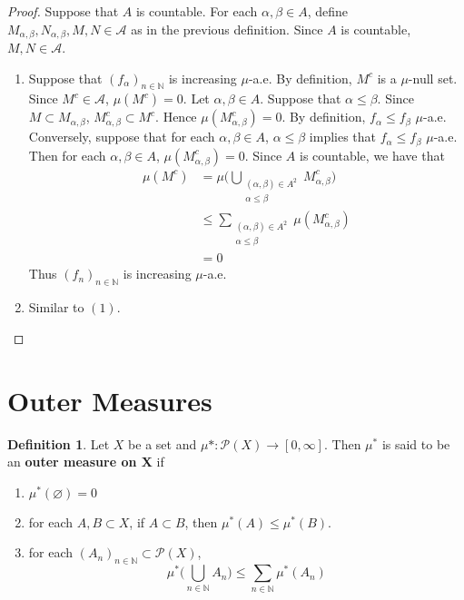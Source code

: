 \documentclass{book}
\theoremstyle{definition}
\newtheorem{defn}[definition]{Definition}
\newcommand{\al}{\alpha}
\newcommand{\be}{\beta}
\newcommand{\N}{\mathbb{N}}
\newcommand{\MA}{\mathcal{A}}
\newcommand{\MP}{\mathcal{P}}
\newcommand{\ld}[1]{\label{defn:#1}}
\DeclareMathOperator*{\0}{\mbf{0}}
\DeclareMathOperator*{\1}{\mbf{1}}
\begin{document}
	\begin{proof} Suppose that $A$ is countable. For each $\al, \be \in A$, define $M_{\al, \be},N_{\al, \be},M,N \in \MA$ as in the previous definition. Since $A$ is countable, $M,N \in \MA$. 
		\begin{enumerate}
			\item Suppose that $(f_{\al})_{n \in \N}$ is increasing $\mu$-a.e. By definition, $M^c$ is a $\mu$-null set. Since $M^c \in \MA$, $\mu(M^c) = 0$. Let $\al, \be \in A$. Suppose that $\al \leq \be$. Since $M \subset M_{\al, \be}$, $M_{\al, \be}^c \subset M^c$. Hence $\mu(M_{\al, \be}^c) = 0$. By definition, $f_{\al} \leq f_{\be}$ $\mu$-a.e.\\
			Conversely, suppose that for each $\al, \be \in A$, $\al \leq \be$ implies that $f_{\al} \leq f_{\be}$ $\mu$-a.e. Then for each $\al, \be \in A$, $\mu(M_{\al, \be}^c) = 0$. Since $A$ is countable, we have that
			\begin{align*}
				\mu(M^c) 
				& = \mu \bigg( \bigcup\limits_{\substack{(\al, \be) \in A^2 \\ \al \leq \be}} M_{\al, \be}^c \bigg) \\
				& \leq \sum_{\substack{(\al, \be) \in A^2 \\ \al \leq \be}} \mu(M_{\al, \be}^c) \\
				& = 0
			\end{align*}
			Thus $(f_n)_{n \in \N}$ is increasing $\mu$-a.e.
			\item Similar to $(1)$.
		\end{enumerate}
	\end{proof}







	
	
	
	
	
	
	
	
	
	
	
	
	
	
	
	
	\newpage
	\section{Outer Measures}
	
	\begin{defn} \ld{00000} 
		Let $X$ be a set and $\mu* : \MP(X) \rightarrow [0, \infty]$. Then $\mu^*$ is said to be an \textbf{outer measure on X} if 
		\begin{enumerate}
			\item $\mu^*(\varnothing) = 0$
			\item for each $A,B \subset X $, if $A \subset B$, then $\mu^*(A) \leq \mu^*(B)$.
			\item for each $(A_n)_{n \in \N} \subset \MP(X)$, $$\mu^*\big(\bigcup\limits_{n \in \N} A_n\big) \leq \sum\limits_{n \in \N}\mu^*(A_n) $$
		\end{enumerate}
	\end{defn}
	
\end{document}
